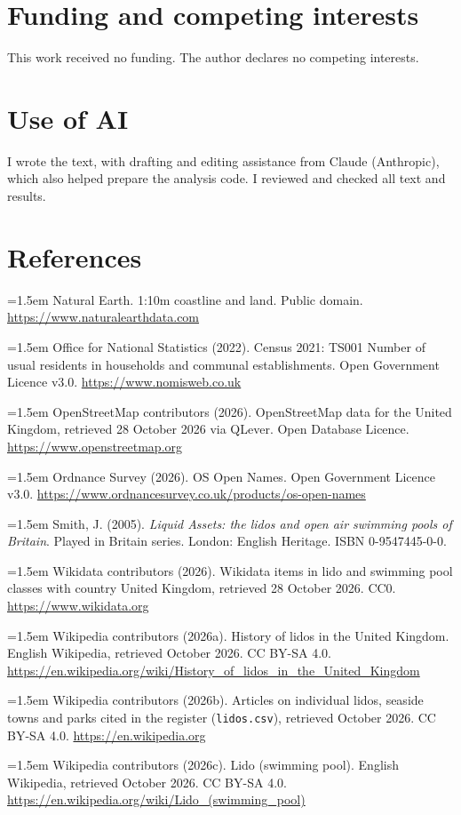 \documentclass[11pt,a4paper]{article}
\begin{document}
\section*{Funding and competing interests}

This work received no funding. The author declares no competing interests.

\section*{Use of AI}

I wrote the text, with drafting and editing assistance from Claude (Anthropic), which also helped prepare the analysis code. I reviewed and checked all text and results.

\section*{References}
\small
\setlength{\parskip}{0.35em}
\hangindent=1.5em Natural Earth. 1:10m coastline and land. Public domain. \url{https://www.naturalearthdata.com}

\hangindent=1.5em Office for National Statistics (2022). Census 2021: TS001 Number of usual residents in households and communal establishments. Open Government Licence v3.0. \url{https://www.nomisweb.co.uk}

\hangindent=1.5em OpenStreetMap contributors (2026). OpenStreetMap data for the United Kingdom, retrieved 28 October 2026 via QLever. Open Database Licence. \url{https://www.openstreetmap.org}

\hangindent=1.5em Ordnance Survey (2026). OS Open Names. Open Government Licence v3.0. \url{https://www.ordnancesurvey.co.uk/products/os-open-names}

\hangindent=1.5em Smith, J. (2005). \textit{Liquid Assets: the lidos and open air swimming pools of Britain}. Played in Britain series. London: English Heritage. ISBN 0-9547445-0-0.

\hangindent=1.5em Wikidata contributors (2026). Wikidata items in lido and swimming pool classes with country United Kingdom, retrieved 28 October 2026. CC0. \url{https://www.wikidata.org}

\hangindent=1.5em Wikipedia contributors (2026a). History of lidos in the United Kingdom. English Wikipedia, retrieved October 2026. CC BY-SA 4.0. \url{https://en.wikipedia.org/wiki/History_of_lidos_in_the_United_Kingdom}

\hangindent=1.5em Wikipedia contributors (2026b). Articles on individual lidos, seaside towns and parks cited in the register (\texttt{lidos.csv}), retrieved October 2026. CC BY-SA 4.0. \url{https://en.wikipedia.org}

\hangindent=1.5em Wikipedia contributors (2026c). Lido (swimming pool). English Wikipedia, retrieved October 2026. CC BY-SA 4.0. \url{https://en.wikipedia.org/wiki/Lido_(swimming_pool)}
\end{document}

